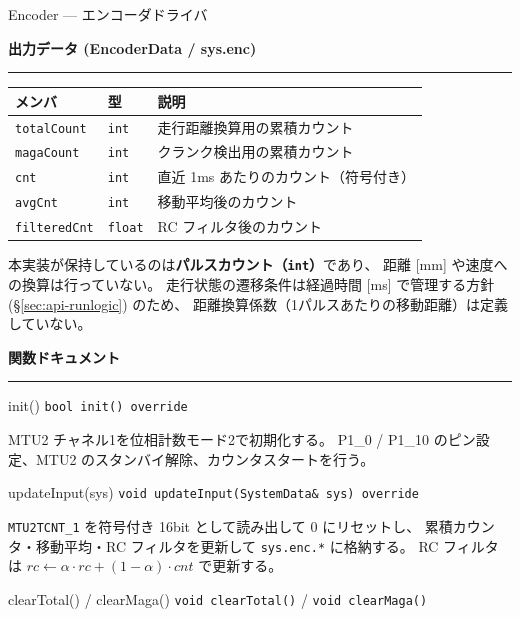 \documentclass[a4paper,11pt,dvipdfmx]{jsarticle}
\makeatletter
\newcommand{\apisection}[1]{%
  \par\addvspace{4mm}%
  {\normalsize\bfseries\color{headerblue} #1}%
  \par\vspace{-1mm}%
  {\color{accentblue!40}\rule{\linewidth}{0.5pt}}%
  \par\nobreak\vspace{2mm}%
  \@afterheading
}
\makeatother
\begin{document}
\begin{apibox}{Encoder --- エンコーダドライバ}
\apisection{出力データ (EncoderData / sys.enc)}

\begin{tabularx}{\textwidth}{l l X}
\toprule
\textbf{メンバ} & \textbf{型} & \textbf{説明} \\
\midrule
\texttt{totalCount}  & \texttt{int}   & 走行距離換算用の累積カウント \\
\texttt{magaCount}   & \texttt{int}   & クランク検出用の累積カウント \\
\texttt{cnt}         & \texttt{int}   & 直近 1ms あたりのカウント（符号付き） \\
\texttt{avgCnt}      & \texttt{int}   & 移動平均後のカウント \\
\texttt{filteredCnt} & \texttt{float} & RC フィルタ後のカウント \\
\bottomrule
\end{tabularx}

\begin{notebox}[距離ではなくパルス数を扱う]
本実装が保持しているのは\textbf{パルスカウント（\texttt{int}）}であり、
距離 [mm] や速度への換算は行っていない。
走行状態の遷移条件は経過時間 [ms] で管理する方針
(\hyperref[sec:api-runlogic]{§\ref*{sec:api-runlogic}}) のため、
距離換算係数（1パルスあたりの移動距離）は定義していない。
\end{notebox}

\apisection{関数ドキュメント}

\begin{funcblock}{init()}
\texttt{bool init() override}

\vspace{1.5mm}
MTU2 チャネル1を位相計数モード2で初期化する。
P1\_0 / P1\_10 のピン設定、MTU2 のスタンバイ解除、カウンタスタートを行う。
\end{funcblock}

\begin{funcblock}{updateInput(sys)}
\texttt{void updateInput(SystemData\& sys) override}

\vspace{1.5mm}
\texttt{MTU2TCNT\_1} を符号付き 16bit として読み出して 0 にリセットし、
累積カウンタ・移動平均・RC フィルタを更新して \texttt{sys.enc.*} に格納する。
RC フィルタは $\mathit{rc} \leftarrow \alpha \cdot \mathit{rc} + (1-\alpha) \cdot \mathit{cnt}$ で更新する。
\end{funcblock}

\begin{funcblock}{clearTotal() / clearMaga()}
\texttt{void clearTotal()} / \texttt{void clearMaga()}


\end{funcblock}
\end{apibox}
\end{document}
